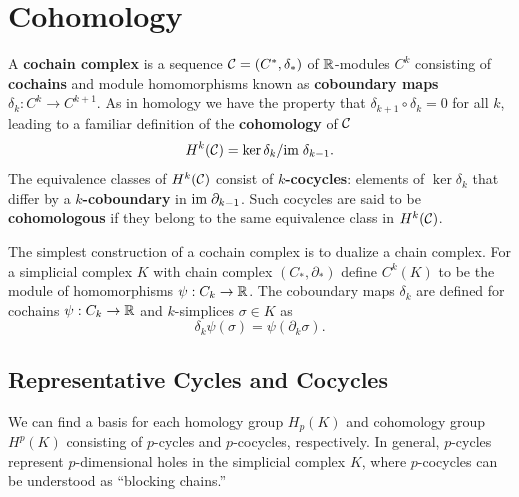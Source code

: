 \section{Cohomology} %
\label{sec:cohomology}

A \textbf{cochain complex} is a sequence $\mathcal{C} = (C^*, \delta_*)$ of $\mathbb{R}$-modules $C^k$ consisting of \textbf{cochains} and module homomorphisms known as \textbf{coboundary maps} $\delta_k:C^k\to C^{k+1}$.
As in homology we have the property that $\delta_{k+1}\circ\delta_k = 0$ for all $k$, leading to a familiar definition of the \textbf{cohomology} of $\mathcal{C}$
\[ H^k(\mathcal{C}) = \ker\delta_k/\mathrm{im}\;\delta_{k-1}.\]
The equivalence classes of $H^k(\mathcal{C})$ consist of \textbf{$k$-cocycles}: elements of $\ker\delta_k$ that differ by a \textbf{$k$-coboundary} in $\mathrm{im}\;\partial_{k-1}$.
Such cocycles are said to be \textbf{cohomologous} if they belong to the same equivalence class in $H^k(\mathcal{C})$.

The simplest construction of a cochain complex is to dualize a chain complex.
For a simplicial complex $K$ with chain complex $(C_*,\partial_*)$ define $C^k(K)$ to be the module of homomorphisms $\psi:C_k\to\mathbb{R}$.
The coboundary maps $\delta_k$ are defined for cochains $\psi:C_k\to\mathbb{R}$ and $k$-simplices $\sigma\in K$ as
\[\delta_k\psi(\sigma) = \psi(\partial_k\sigma).\]

\subsection{Representative Cycles and Cocycles}

We can find a basis for each homology group $H_p(K)$ and cohomology group $H^p(K)$ consisting of $p$-cycles and $p$-cocycles, respectively.
In general, $p$-cycles represent $p$-dimensional holes in the simplicial complex $K$, where $p$-cocycles can be understood as ``blocking chains.''

